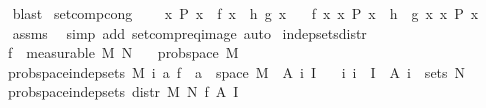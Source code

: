 \begin{isabellebody}
%
\isadelimproof
\ \ %
\endisadelimproof
%
\isatagproof
{}\isamarkupfalse%
\ blast%
\endisatagproof
{\isafoldproof}%
%
\isadelimproof
\isanewline
%
\endisadelimproof
\isanewline
{}\isamarkupfalse%
\ set{\isacharunderscore}{\kern0pt}comp{\isacharunderscore}{\kern0pt}cong{\isacharcolon}{\kern0pt}\ \isanewline
\ \ \ {\isachardoublequoteopen}{\isasymAnd}x{\isachardot}{\kern0pt}\ P\ x\ {\isasymLongrightarrow}\ f\ x\ {\isacharequal}{\kern0pt}\ h\ {\isacharparenleft}{\kern0pt}g\ x{\isacharparenright}{\kern0pt}{\isachardoublequoteclose}\isanewline
\ \ \ {\isachardoublequoteopen}{\isacharbraceleft}{\kern0pt}f\ x{\isacharbar}{\kern0pt}\ x{\isachardot}{\kern0pt}\ P\ x{\isacharbraceright}{\kern0pt}\ {\isacharequal}{\kern0pt}\ h\ {\isacharbackquote}{\kern0pt}\ {\isacharbraceleft}{\kern0pt}g\ x{\isacharbar}{\kern0pt}\ x{\isachardot}{\kern0pt}\ P\ x{\isacharbraceright}{\kern0pt}{\isachardoublequoteclose}\isanewline
%
\isadelimproof
\ \ %
\endisadelimproof
%
\isatagproof
{}\isamarkupfalse%
\ assms\ \isamarkupfalse%
\ {\isacharparenleft}{\kern0pt}simp\ add{\isacharcolon}{\kern0pt}\ setcompr{\isacharunderscore}{\kern0pt}eq{\isacharunderscore}{\kern0pt}image{\isacharcomma}{\kern0pt}\ auto{\isacharparenright}{\kern0pt}%
\endisatagproof
{\isafoldproof}%
%
\isadelimproof
\isanewline
%
\endisadelimproof
\isanewline
{}\isamarkupfalse%
\ indep{\isacharunderscore}{\kern0pt}sets{\isacharunderscore}{\kern0pt}distr{\isacharcolon}{\kern0pt}\isanewline
\ \ \ {\isachardoublequoteopen}f\ {\isasymin}\ measurable\ M\ N{\isachardoublequoteclose}\isanewline
\ \ \ {\isachardoublequoteopen}prob{\isacharunderscore}{\kern0pt}space\ M{\isachardoublequoteclose}\isanewline
\ \ \ {\isachardoublequoteopen}prob{\isacharunderscore}{\kern0pt}space{\isachardot}{\kern0pt}indep{\isacharunderscore}{\kern0pt}sets\ M\ {\isacharparenleft}{\kern0pt}{\isasymlambda}i{\isachardot}{\kern0pt}\ {\isacharparenleft}{\kern0pt}{\isasymlambda}a{\isachardot}{\kern0pt}\ f\ {\isacharminus}{\kern0pt}{\isacharbackquote}{\kern0pt}\ a\ {\isasyminter}\ space\ M{\isacharparenright}{\kern0pt}\ {\isacharbackquote}{\kern0pt}\ A\ i{\isacharparenright}{\kern0pt}\ I{\isachardoublequoteclose}\isanewline
\ \ \ {\isachardoublequoteopen}{\isasymAnd}i{\isachardot}{\kern0pt}\ i\ {\isasymin}\ I\ {\isasymLongrightarrow}\ A\ i\ {\isasymsubseteq}\ sets\ N{\isachardoublequoteclose}\isanewline
\ \ \ {\isachardoublequoteopen}prob{\isacharunderscore}{\kern0pt}space{\isachardot}{\kern0pt}indep{\isacharunderscore}{\kern0pt}sets\ {\isacharparenleft}{\kern0pt}distr\ M\ N\ f{\isacharparenright}{\kern0pt}\ A\ I{\isachardoublequoteclose}\isanewline

\end{isabellebody}
